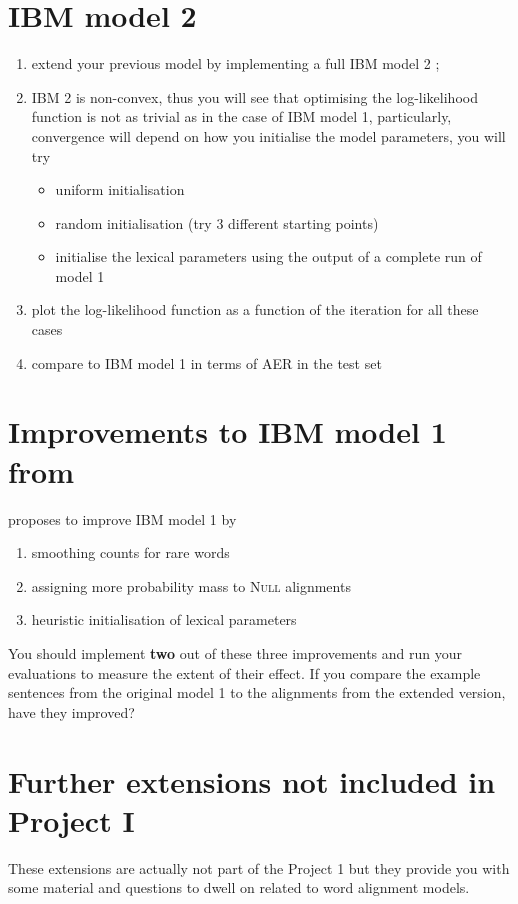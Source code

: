 \section{IBM model 2}

\begin{enumerate}
  \item extend your previous model by implementing a full IBM model 2 \citep{Brown+1993:smt};
  \item IBM 2 is non-convex, thus you will see that optimising the log-likelihood function is 
        not as trivial as in the case of IBM model 1, particularly, convergence will depend 
        on how you initialise the model parameters, you will try
  \begin{itemize}
    \item uniform initialisation
    \item random initialisation (try 3 different starting points)
    \item initialise the lexical parameters using the output of a complete run of model 1
  \end{itemize}
  \item plot the log-likelihood function as a function of the iteration for all these cases
  \item compare to IBM model 1 in terms of AER in the test set
\end{enumerate}


\section{Improvements to IBM model 1 from \cite{Moore:2004:IBM1}}

\citet{Moore:2004:IBM1} proposes to improve IBM model 1 by
\begin{enumerate} 
  \item smoothing counts for rare words
  \item assigning more probability mass to \textsc{Null} alignments
  \item heuristic initialisation of lexical parameters
\end{enumerate}

You should implement {\bf two} out of these three improvements and run your evaluations
to measure the extent of their effect.
If you compare the example sentences from the original model 1 to the
alignments from the extended version, have they improved?
%
%
\section{Further extensions not included in Project I}
These extensions are actually not part of the Project 1 but they provide you with
some material and questions to dwell on related to word alignment models.

